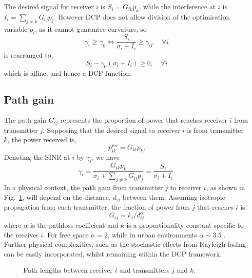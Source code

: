 \documentclass[twocolumn,secnumarabic,amssymb, nobibnotes, aps, prl,superscriptaddress]{revtex4-1}
\begin{document}
The desired signal for receiver $i$ is $S_i = G_{ik}p_k$, while the interference at $i$ is $I_i = \sum_{j\neq k}G_{ij}p_j$. However DCP does not allow division of the optimisation variable $p_i$, as it cannot guarantee curvature, so  
\begin{equation*}
  \gamma_i \geq \gamma_0\Longleftrightarrow  \frac{S_i}{\sigma_i + I_i}\geq \gamma_0, \quad \forall i
\end{equation*}
is rearranged to,
\begin{equation*}
S_i-\gamma_0(\sigma_i + I_i)\geq 0, \quad \forall i
\end{equation*} which is affine, and hence a DCP function.

\subsection{Path gain}
\noindent The path gain $G_{ij}$ represents the proportion of power that reaches receiver $i$ from transmitter $j$. Supposing that the desired signal to receiver $i$ is from transmitter $k$, the power received is,
\begin{equation}
p_{ik}^{\text{rec}} = G_{ik}p_k.
\end{equation}
Denoting the SINR at $i$ by $\gamma_i$, we have
\begin{equation}
\gamma_i = \frac{G_{ik}p_k}{\sigma_i+\sum_{j\neq k}G_{ij}p_j}
=\frac{S_i}{\sigma_i+I_i}.
\end{equation}
In a physical context, the path gain from transmitter $j$ to receiver $i$, as shown in Fig.~\ref{fig:pathgain}, will depend on the distance, $d_{ij}$ between them. Assuming isotropic propagation from each transmitter, the fraction of power from $j$ that reaches $i$ is:
\begin{equation}
G_{ij} = k_i/d_{ij}^\alpha
\end{equation}
where $\alpha$ is the pathloss coefficient and $k$ is a proportionality constant specific to the receiver $i$.  For free space $\alpha = 2$, while in urban environments $\alpha \sim 3.5$ \cite{hata1980}. Further physical complexities, such as the stochastic effects from Rayleigh fading can be easily incorporated, whilst remaining within the DCP framework.

\begin{figure}[H]
\centering
{}
\caption{\label{fig:pathgain}Path lengths between receiver $i$ and transmitters $j$ and $k$.}
\end{figure}
\end{document}
